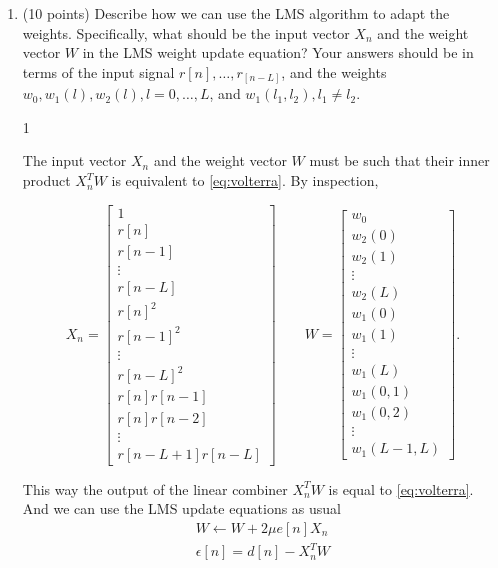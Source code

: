 \documentclass[10pt]{article}
\def\SOLUTIONS{0} %
\def\SolutionsColor{red2}
\begin{document}
\begin{enumerate}[label=(\alph*)]
	\item (10 points) Describe how we can use the LMS algorithm to adapt the weights. Specifically, what should be the input vector $X_n$ and the weight vector $W$ in the LMS weight update equation? Your answers should be in terms of the input signal $r[n], \ldots, r_[n-L]$, and the weights $w_0, w_1(l), w_2(l), l = 0, \ldots, L$, and $w_1(l_1, l_2), l_1\neq l_2$.  
	
	\if\SOLUTIONS1 {\color{\SolutionsColor}
		The input vector $X_n$ and the weight vector $W$ must be such that their inner product $X_n^TW$ is equivalent to \eqref{eq:volterra}. By inspection, 
		
		\begin{equation}
		X_n = \begin{bmatrix}
		1 \\
		r[n] \\
		r[n-1] \\
		\vdots \\
		r[n-L] \\
		r[n]^2 \\
		r[n-1]^2 \\
		\vdots \\
		r[n-L]^2 \\
		r[n]r[n-1] \\
		r[n]r[n-2] \\
		\vdots \\
		r[n-L+1]r[n-L]
		\end{bmatrix} \qquad W = \begin{bmatrix}
		w_0 \\
		w_2(0) \\
		w_2(1) \\
		\vdots \\
		w_2(L) \\
		w_1(0) \\
		w_1(1) \\
		\vdots \\
		w_1(L) \\
		w_1(0, 1) \\
		w_1(0, 2) \\
		\vdots \\
		w_1(L-1, L)
		\end{bmatrix}.
		\end{equation}
		
		This way the output of the linear combiner $X_n^TW$ is equal to \eqref{eq:volterra}. And we can use the LMS update equations as usual
		\begin{align}
		W \leftarrow W + 2\mu e[n]X_n \\
		\epsilon[n] = d[n] - X_n^TW
		\end{align}
	}
	\fi
	

\end{enumerate}
\end{document}
